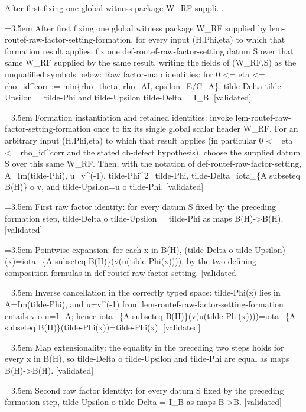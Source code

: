 \documentclass{article}
\newcommand{\step}[1]{\par\noindent\hangindent=3.5em\hangafter=1%
  \makebox[3.5em][l]{\textbf{#1.}}}
\newcommand{\steptag}[1]{\hfill{\small\textsf{[#1]}}}
\begin{document}
\begin{proofbox}{After first fixing one global witness package W\_RF suppli...}
\step{1} After first fixing one global witness package W\_RF supplied by lem-routef-raw-factor-setting-formation, for every input (H,Phi,eta) to which that formation result applies, fix one def-routef-raw-factor-setting datum S over that same W\_RF supplied by the same result, writing the fields of (W\_RF,S) as the unqualified symbols below: Raw factor-map identities: for 0 <= eta <= rho\_id\textasciicircum{}corr := min\{rho\_theta, rho\_AI, epsilon\_E/C\_A\}, tilde-Delta tilde-Upsilon = tilde-Phi and tilde-Upsilon tilde-Delta = I\_B. \steptag{validated} \\[6pt]
\step{1.1} Formation instantiation and retained identities: invoke lem-routef-raw-factor-setting-formation once to fix its single global scalar header W\_RF. For an arbitrary input (H,Phi,eta) to which that result applies (in particular 0 <= eta <= rho\_id\textasciicircum{}corr and the stated cb-defect hypothesis), choose the supplied datum S over this same W\_RF. Then, with the notation of def-routef-raw-factor-setting, A=Im(tilde-Phi), u=v\textasciicircum{}(-1), tilde-Phi\textasciicircum{}2=tilde-Phi, tilde-Delta=iota\_\{A subseteq B(H)\} o v, and tilde-Upsilon=u o tilde-Phi. \steptag{validated} \\[4pt]
\step{1.2} First raw factor identity: for every datum S fixed by the preceding formation step, tilde-Delta o tilde-Upsilon = tilde-Phi as maps B(H)->B(H). \steptag{validated} \\[6pt]
\step{1.2.1} Pointwise expansion: for each x in B(H), (tilde-Delta o tilde-Upsilon)(x)=iota\_\{A subseteq B(H)\}(v(u(tilde-Phi(x)))), by the two defining composition formulas in def-routef-raw-factor-setting. \steptag{validated} \\[4pt]
\step{1.2.2} Inverse cancellation in the correctly typed space: tilde-Phi(x) lies in A=Im(tilde-Phi), and u=v\textasciicircum{}(-1) from lem-routef-raw-factor-setting-formation entails v o u=I\_A; hence iota\_\{A subseteq B(H)\}(v(u(tilde-Phi(x))))=iota\_\{A subseteq B(H)\}(tilde-Phi(x))=tilde-Phi(x). \steptag{validated} \\[4pt]
\step{1.2.3} Map extensionality: the equality in the preceding two steps holds for every x in B(H), so tilde-Delta o tilde-Upsilon and tilde-Phi are equal as maps B(H)->B(H). \steptag{validated} \\[4pt]
\step{1.3} Second raw factor identity: for every datum S fixed by the preceding formation step, tilde-Upsilon o tilde-Delta = I\_B as maps B->B. \steptag{validated} \\[6pt]

\end{proofbox}
\end{document}
